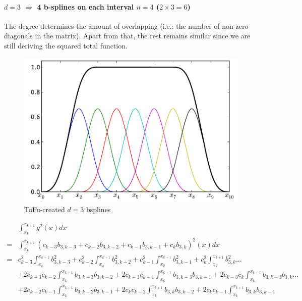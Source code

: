 \documentclass[paper=a4, fontsize=11pt]{book}
\numberwithin{equation}{section}		%
\numberwithin{figure}{section}			%
\numberwithin{table}{section}				%
\begin{document}
\begin{landscape}
\newpage
\paragraph{\textbf{$d=3$ $\Rightarrow$ 4 b-splines on each interval $n=4$ ($2\times3=6$)}}

The degree determines the amount of overlapping (i.e.: the number of non-zero diagonals in the matrix).
Apart from that, the rest remains similar since we are still deriving the squared total function.

\begin{figure}
  \vspace{-20pt}
  \begin{center}
    \includegraphics[scale=0.4]{Fig02_BSplines_Int_D3.pdf}
  \end{center}
  \vspace{-20pt}
  \caption{\footnotesize ToFu-created $d=3$ bsplines}
  \vspace{-10pt}
\end{figure}

$$
\begin{array}{lll}
& \int_{x_k}^{x_{k+1}} g^2(x)dx\\
= & \int_{x_k}^{x_{k+1}} \left( c_{k-3}b_{3,k-3} + c_{k-2}b_{3,k-2} + c_{k-1}b_{3,k-1} + c_{k}b_{3,k} \right)^2(x)dx\\
= & c_{k-3}^2\int_{x_k}^{x_{k+1}}b_{3,k-3}^2 + c_{k-2}^2\int_{x_k}^{x_{k+1}}b_{3,k-2}^2 + c_{k-1}^2\int_{x_k}^{x_{k+1}}b_{3,k-1}^2 + c_{k}^2\int_{x_k}^{x_{k+1}}b_{3,k}^2 ...\\
  & + 2c_{k-3}c_{k-2}\int_{x_k}^{x_{k+1}}b_{3,k-3}b_{3,k-2} + 2c_{k-3}c_{k-1}\int_{x_k}^{x_{k+1}}b_{3,k-3}b_{3,k-1} + 2c_{k-3}c_{k}\int_{x_k}^{x_{k+1}}b_{3,k-3}b_{3,k} ...\\
  & + 2c_{k-2}c_{k-1}\int_{x_k}^{x_{k+1}}b_{3,k-2}b_{3,k-1} + 2c_{k}c_{k-2}\int_{x_k}^{x_{k+1}}b_{3,k}b_{3,k-2} + 2c_{k}c_{k-1}\int_{x_k}^{x_{k+1}}b_{3,k}b_{3,k-1}
\end{array}
$$


\end{landscape}
\end{document}
